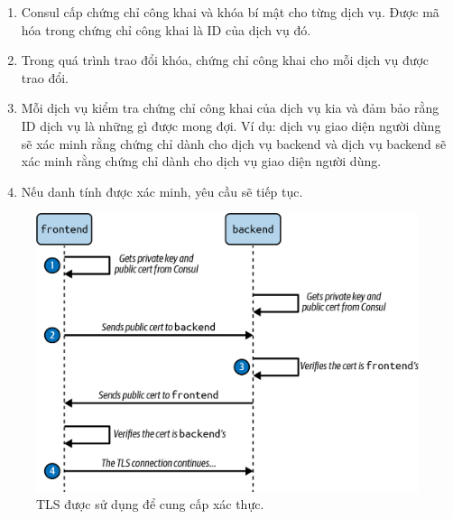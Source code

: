 \documentclass[14pt,a4paper]{report}
\begin{document}
{	\hspace{0.3cm}{Đây là các bước liên quan đến xác thực TLS:}
	
	\begin{enumerate}
	\item Consul cấp chứng chỉ công khai và khóa bí mật cho từng dịch vụ. Được mã hóa trong chứng chỉ công khai là ID của dịch vụ đó.
	\item Trong quá trình trao đổi khóa, chứng chỉ công khai cho mỗi dịch vụ được trao đổi.
	\item Mỗi dịch vụ kiểm tra chứng chỉ công khai của dịch vụ kia và đảm bảo rằng ID dịch vụ là những gì được mong đợi. Ví dụ: dịch vụ giao diện người dùng sẽ xác minh rằng chứng chỉ dành cho dịch vụ backend và dịch vụ backend sẽ xác minh rằng chứng chỉ dành cho dịch vụ giao diện người dùng.
	\item Nếu danh tính được xác minh, yêu cầu sẽ tiếp tục.
	\end{enumerate}

	\begin{figure}[h]
		\centering
		\includegraphics[width=0.7\linewidth]{Pics/TLS_provide_authentication}
		\caption{\label{fig:tlsprovideauthentication} TLS được sử dụng để cung cấp xác thực.}
		\label{fig:tlsprovideauthentication}
	\end{figure}
	
	\hspace{0.3cm}{Chúng ta có thể tự hỏi điều gì ngăn kẻ tấn công tạo chứng chỉ công khai của riêng chúng để mạo danh bất kỳ dịch vụ nào. Để ngăn chặn điều này, Consul hoạt động như một cơ quan cấp chứng chỉ.\\}
	
	\hspace{0.3cm}{Cơ quan cấp chứng chỉ là một thực thể cấp chứng chỉ được ký bằng mật mã sao cho chúng chỉ có thể đến từ cơ quan cấp chứng chỉ đó. Cơ quan cấp chứng chỉ cũng có chứng chỉ công khai được gọi là chứng chỉ của cơ quan cấp chứng chỉ (chứng chỉ CA). Khi xuất trình chứng chỉ công khai của dịch vụ - ví dụ: chứng chỉ backend - bên thứ ba có thể sử dụng chứng chỉ CA để kiểm tra xem chứng chỉ công khai có được ký bởi cơ quan cấp chứng chỉ đó hay không.\\}
	
}
\end{document}
